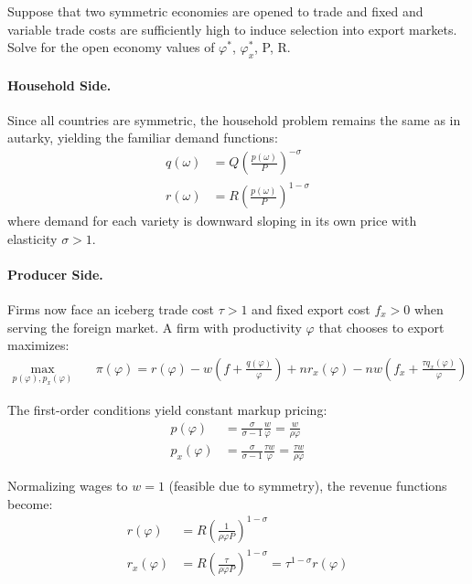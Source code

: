 Suppose that two symmetric economies are opened to trade and fixed and variable trade costs are sufficiently high to induce selection into export markets. Solve for the open economy values of $\varphi^*$, $\varphi^*_x$, P, R.

\begin{solution}
	\paragraph{Household Side.} Since all countries are symmetric, the household problem remains the same as in autarky, yielding the familiar demand functions:
	\begin{align*}
		q(\omega) &= Q \left( \frac{p(\omega)}{P} \right)^{-\sigma}\\
		r(\omega) &= R \left( \frac{p(\omega)}{P} \right)^{1 - \sigma}
	\end{align*}
	where demand for each variety is downward sloping in its own price with elasticity $\sigma>1$.

	\paragraph{Producer Side.} Firms now face an iceberg trade cost $\tau>1$ and fixed export cost $f_x>0$ when serving the foreign market. A firm with productivity $\varphi$ that chooses to export maximizes:
	\begin{align*}
		\max_{p(\varphi), p_x(\varphi)} \quad & \pi(\varphi) = r(\varphi) - w \left( f + \frac{q(\varphi)}{\varphi} \right) + n r_x(\varphi) - n w \left( f_x + \frac{\tau q_x(\varphi)}{\varphi} \right)
	\end{align*}

	The first-order conditions yield constant markup pricing:
	\begin{align*}
		p(\varphi) &= \frac{\sigma}{\sigma - 1} \frac{w}{\varphi} = \frac{w}{\rho \varphi} \\
		p_x(\varphi) &= \frac{\sigma}{\sigma - 1} \frac{\tau w}{\varphi} = \frac{\tau w}{\rho \varphi}
	\end{align*}

	Normalizing wages to $w=1$ (feasible due to symmetry), the revenue functions become:
	\begin{align*}
		r(\varphi) &= R \left( \frac{1}{\rho \varphi P} \right)^{1 - \sigma} \\
		r_x(\varphi) &= R \left( \frac{\tau}{\rho \varphi P} \right)^{1 - \sigma} = \tau^{1-\sigma} r(\varphi)
	\end{align*}


\end{solution}
